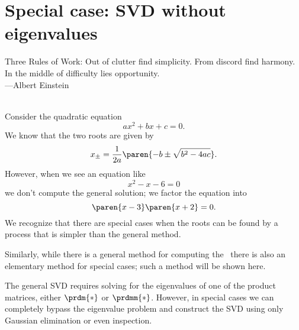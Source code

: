 \chapter[SVD without eigenvalues]{Special case: SVD without eigenvalues}
\label{chap:simple}

\begin{chapterquote}[120pt]
Three Rules of Work: Out of clutter find simplicity. From discord find harmony. In the middle of difficulty lies opportunity.\\
---{\upshape Albert Einstein}
\end{chapterquote}
\ \\
Consider the quadratic equation
\begin{equation}
  ax^{2}+bx+c = 0.
\end{equation}
We know that the two roots are given by
\begin{equation}
  x_{\pm} = \frac{1}{2a}\paren{-b\pm\sqrt{b^{2}-4ac}}.
\end{equation}
However, when we see an equation like
\begin{equation}
  x^{2}-x-6 = 0
\end{equation}
we don't compute the general solution; we factor the equation into
\begin{equation}
  \paren{x-3}\paren{x+2} = 0.
\end{equation}
We recognize that there are special cases when the roots can be found by a process that is simpler than the general method.

Similarly, while there is a general method for computing the \svdp \ there is also an elementary method for special cases; such a method will be shown here.

The general SVD requires solving for the eigenvalues of one of the product matrices, either $\prdm{*}$ or $\prdmm{*}$. However, in special cases we can completely bypass the eigenvalue problem and construct the SVD using only Gaussian elimination or even inspection.







\endinput